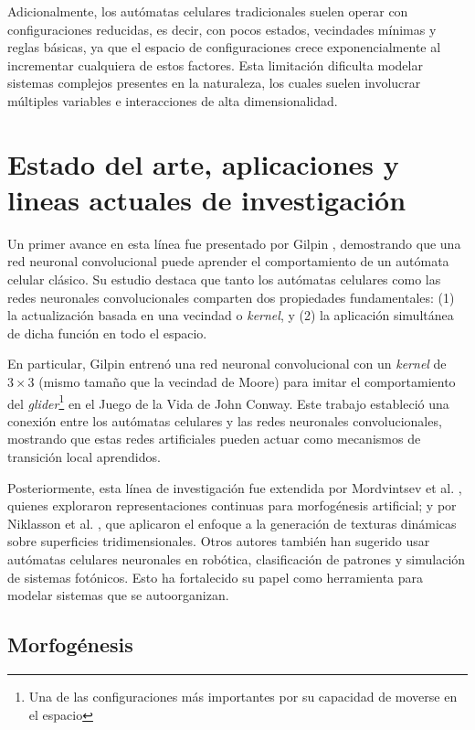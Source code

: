 Adicionalmente, los autómatas celulares tradicionales suelen operar con configuraciones reducidas, es decir, con pocos estados, vecindades mínimas y reglas básicas, ya que el espacio de configuraciones crece exponencialmente al incrementar cualquiera de estos factores. Esta limitación dificulta modelar sistemas complejos presentes en la naturaleza, los cuales suelen involucrar múltiples variables e interacciones de alta dimensionalidad.

\section{Estado del arte, aplicaciones y lineas actuales de investigación}

Un primer avance en esta línea fue presentado por Gilpin \cite{gilpinNCA}, demostrando que una red neuronal convolucional puede aprender el comportamiento de un autómata celular clásico. Su estudio destaca que tanto los autómatas celulares como las redes neuronales convolucionales comparten dos propiedades fundamentales: (1) la actualización basada en una vecindad o \textit{kernel}, y (2) la aplicación simultánea de dicha función en todo el espacio.

En particular, Gilpin entrenó una red neuronal convolucional con un \textit{kernel} de $3 \times 3$ (mismo tamaño que la vecindad de Moore) para imitar el comportamiento del \textit{glider}\footnote{Una de las configuraciones más importantes por su capacidad de moverse en el espacio} en el Juego de la Vida de John Conway. Este trabajo estableció una conexión entre los autómatas celulares y las redes neuronales convolucionales, mostrando que estas redes artificiales pueden actuar como mecanismos de transición local aprendidos.

Posteriormente, esta línea de investigación fue extendida por Mordvintsev et al. \cite{mordvintsevNCA}, quienes exploraron representaciones continuas para morfogénesis artificial; y por Niklasson et al. \cite{NiklassonNCA}, que aplicaron el enfoque a la generación de texturas dinámicas sobre superficies tridimensionales. Otros autores también han sugerido usar autómatas celulares neuronales en robótica, clasificación de patrones y simulación de sistemas fotónicos. Esto ha fortalecido su papel como herramienta para modelar sistemas que se autoorganizan.

\subsection{Morfogénesis}

